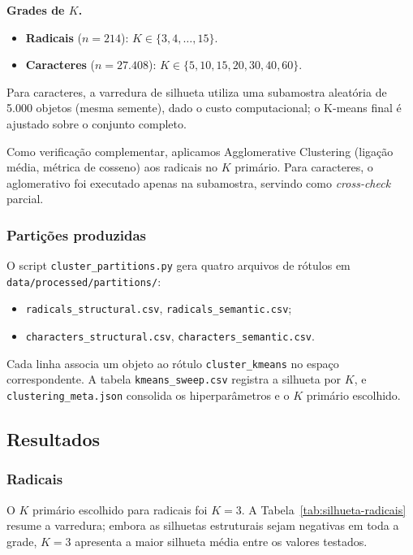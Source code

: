 \documentclass[10pt, a4paper, titlepage]{extarticle}
\begin{document}
\textbf{Grades de $K$.}
\begin{itemize}
    \item \textbf{Radicais} ($n = 214$): $K \in \{3, 4, \ldots, 15\}$.
    \item \textbf{Caracteres} ($n = 27.408$): $K \in \{5, 10, 15, 20, 30, 40, 60\}$.
\end{itemize}
Para caracteres, a varredura de silhueta utiliza uma subamostra
aleatória de 5.000 objetos (mesma semente), dado o custo computacional;
o K-means final é ajustado sobre o conjunto completo.

Como verificação complementar, aplicamos Agglomerative Clustering
(ligação média, métrica de cosseno) aos radicais no $K$ primário. Para
caracteres, o aglomerativo foi executado apenas na subamostra, servindo
como \emph{cross-check} parcial.

\subsubsection{Partições produzidas}
O script \texttt{cluster\_partitions.py} gera quatro arquivos de rótulos em
\texttt{data/processed/partitions/}:
\begin{itemize}
    \item \texttt{radicals\_structural.csv},\; \texttt{radicals\_semantic.csv};
    \item \texttt{characters\_structural.csv},\; \texttt{characters\_semantic.csv}.
\end{itemize}
Cada linha associa um objeto ao rótulo \texttt{cluster\_kmeans} no espaço
correspondente. A tabela \texttt{kmeans\_sweep.csv} registra a silhueta por
$K$, e \texttt{clustering\_meta.json} consolida os hiperparâmetros e o
$K$ primário escolhido.

\subsection{Resultados}
\subsubsection{Radicais}
O $K$ primário escolhido para radicais foi \textbf{$K = 3$}.
A Tabela~\ref{tab:silhueta-radicais} resume a varredura; embora as silhuetas
estruturais sejam negativas em toda a grade, $K = 3$ apresenta a maior
silhueta média entre os valores testados.
\end{document}
